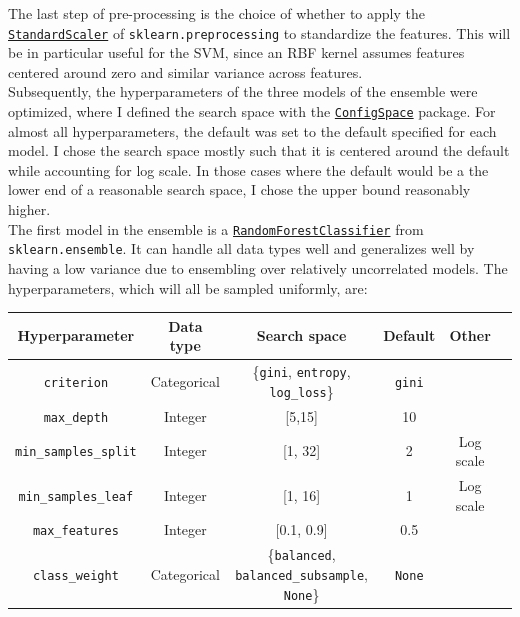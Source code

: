 \documentclass[11pt]{article}
\begin{document}
The last step of pre-processing is  the choice of whether to apply the \href{https://scikit-learn.org/stable/modules/generated/sklearn.preprocessing.StandardScaler.html}{\texttt{StandardScaler}} of \texttt{sklearn.preprocessing} to standardize the features. This will be in particular useful for the SVM, since an RBF kernel assumes features centered around zero and similar variance across features. \\

Subsequently, the hyperparameters of the three models of the ensemble were optimized, where I defined the search space with the \href{https://automl.github.io/ConfigSpace/main/}{\texttt{ConfigSpace}} package. For almost all hyperparameters, the default was set to the default specified for each model. I chose the search space mostly such that it is centered around the default while accounting for log scale. In those cases where the default would be a the lower end of a reasonable search space, I chose the upper bound reasonably higher. \\

The first model in the ensemble is a \href{https://scikit-learn.org/stable/modules/generated/sklearn.ensemble.RandomForestClassifier.html}{\texttt{RandomForestClassifier}} from \texttt{sklearn.ensemble}. It can handle all data types well and generalizes well by having a low variance due to ensembling over relatively uncorrelated models. The hyperparameters, which will all be sampled uniformly, are:

\begin{table}[H]
\centering
\begin{tabular}{ | c | c | c | c | c | c | }
 \hline
  Hyperparameter & Data type & Search space & Default & Other \\
 \hline
 \texttt{criterion} & Categorical & \{\texttt{gini}, \texttt{entropy}, \texttt{log\_loss}\} & \texttt{gini} &   \\ 
 \texttt{max\_depth}  & Integer & [5,15] & 10 &  \\ 
 \texttt{min\_samples\_split} & Integer & [1, 32] & 2 & Log scale \\ 
 \texttt{min\_samples\_leaf} & Integer & [1, 16] & 1 & Log scale  \\ 
 \texttt{max\_features} & Integer & [0.1, 0.9] & 0.5 &   \\  
 \texttt{class\_weight} & Categorical & \{\texttt{balanced}, \texttt{balanced\_subsample}, \texttt{None}\}  & \texttt{None} &  \\ 
 \hline
\end{tabular}
\end{table}
\end{document}
